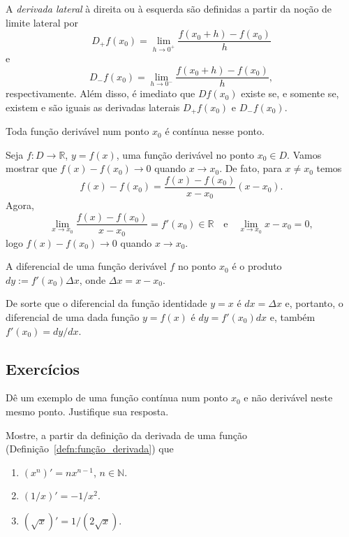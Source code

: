 \begin{obs}
  A \emph{derivada lateral} à direita ou à esquerda são definidas a partir da noção de limite lateral por
  \begin{equation}
    D_+f(x_0) = \lim_{h\to 0^+} \frac{f(x_0+h) - f(x_0)}{h}
  \end{equation}
  e
  \begin{equation}
    D_-f(x_0) = \lim_{h\to 0^-} \frac{f(x_0+h) - f(x_0)}{h},
  \end{equation}
  respectivamente. Além disso, é imediato que $Df(x_0)$ existe se, e somente se, existem e são iguais as derivadas laterais $D_+f(x_0)$ e $D_-f(x_0)$.
\end{obs}

\begin{teo}
  Toda função derivável num ponto $x_0$ é contínua nesse ponto.
\end{teo}
\begin{dem}
  Seja $f:D\to\mathbb{R}$, $y=f(x)$, uma função derivável no ponto $x_0\in D$. Vamos mostrar que $f(x)-f(x_0)\to 0$ quando $x\to x_0$. De fato, para $x\neq x_0$ temos
  \begin{equation}
    f(x) - f(x_0) = \frac{f(x) - f(x_0)}{x-x_0}(x-x_0).
  \end{equation}
Agora, 
\begin{equation}
  \lim_{x\to x_0} \frac{f(x) - f(x_0)}{x-x_0} = f'(x_0)\in\mathbb{R}\quad\text{e}\quad\lim_{x\to x_0} x-x_0 = 0,
\end{equation}
logo $f(x)-f(x_0)\to 0$ quando $x\to x_0$.
\end{dem}

\begin{defn}
  A diferencial de uma função derivável $f$ no ponto $x_0$ é o produto $dy := f'(x_0)\Delta x$, onde $\Delta x = x-x_0$.
\end{defn}

\begin{obs}
  De sorte que o diferencial da função identidade $y = x$ é $dx = \Delta x$ e, portanto, o diferencial de uma dada função $y = f(x)$ é $dy = f'(x_0)dx$ e, também $f'(x_0) = dy/dx$.
\end{obs}

\subsection*{Exercícios}

\begin{exer}
  Dê um exemplo de uma função contínua num ponto $x_0$ e não derivável neste mesmo ponto. Justifique sua resposta.
\end{exer}

\begin{exer}
  Mostre, a partir da definição da derivada de uma função (Definição~\ref{defn:função_derivada}) que
  \begin{enumerate}
  \item $(x^n)' = nx^{n-1}$, $n\in\mathbb{N}$.
  \item $(1/x)' = -1/x^2$.
  \item $(\sqrt{x})' = 1/(2\sqrt{x})$.
  \end{enumerate}
\end{exer}
